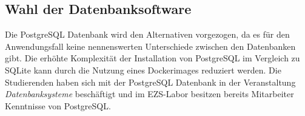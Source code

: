 \subsection{Wahl der Datenbanksoftware}
Die PostgreSQL Datenbank wird den Alternativen vorgezogen, da es für den Anwendungsfall keine nennenswerten Unterschiede zwischen den Datenbanken gibt. Die erhöhte Komplexität der Installation von PostgreSQL im Vergleich zu SQLite kann durch die Nutzung eines Dockerimages reduziert werden. Die Studierenden haben sich mit der PostgreSQL Datenbank in der Veranstaltung \textit{Datenbanksysteme} beschäftigt und im EZS-Labor besitzen bereits Mitarbeiter Kenntnisse von PostgreSQL.